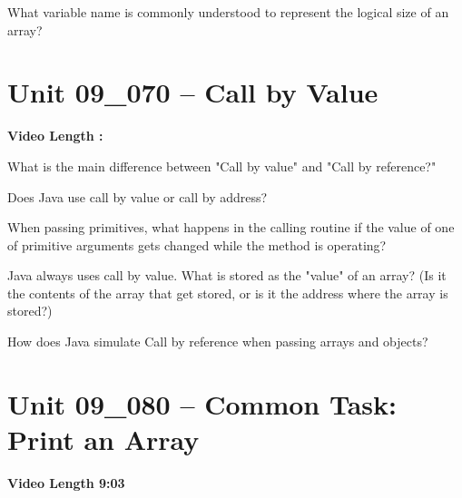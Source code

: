 \documentclass[letterpaper,12pt]{exam}
\newcommand{\unit}{Unit 09}
\begin{document}
\begin{questions}
\begin{samepage}
    \question What variable name is commonly understood to represent the logical size of an array?
    \vspace{5mm}
\end{samepage}

\section*{\unit\_070 -- Call by Value } 
\par{\selectfont\textbf{Video Length :}}

\begin{samepage}
    \question What is the main difference between "Call by value" and "Call by reference?"
    \vspace{5mm}
\end{samepage}

\begin{samepage}
    \question Does Java use call by value or call by address?
    \vspace{5mm}
\end{samepage}

\begin{samepage}
    \question When passing primitives, what happens in the calling routine if the value of one of primitive arguments gets changed while the method is operating?
    \vspace{5mm}
\end{samepage}

\begin{samepage}
    \question Java always uses call by value.  What is stored as the "value" of an array?  (Is it the contents of the array that get stored, or is it the address where the array is stored?)
    \vspace{5mm}
\end{samepage}

\begin{samepage}
    \question How does Java simulate Call by reference when passing arrays and objects?
    \vspace{5mm}
\end{samepage}

\section*{\unit\_080 -- Common Task: Print an Array} 
\par{\selectfont\textbf{Video Length 9:03}}


\end{questions}
\end{document}
